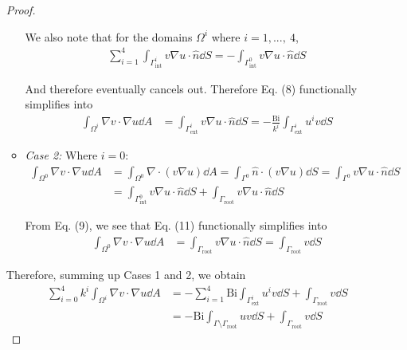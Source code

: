 \begin{enumerate}[label=(\alph*),leftmargin=*,itemsep=0mm]
\begin{proof}
\begin{itemize}
        We also note that for the domains $\Omega^i$ where $i=1, ...,\> 4$,
        \begin{align}
            \sum_{i=1}^{4} \int_{\Gamma^i_\text{int}} v\nabla u \cdot \hat{n} \dd{S} =
            - \int_{\Gamma^0_\text{int}} v\nabla u \cdot \hat{n} \dd{S}
        \end{align}
        
        And therefore eventually cancels out.  Therefore Eq. (8) functionally simplifies into
        \begin{align}
            \int_{\Omega^i} \nabla v \cdot \nabla u \dd{A}
            &= \int_{\Gamma^i_\text{ext}} v\nabla u \cdot \hat{n} \dd{S}
            = -\frac{\text{Bi}}{k^i} \int_{\Gamma^i_\text{ext}} u^i v \dd{S}
        \end{align}
        
        \item \textit{Case 2:} Where $i=0$:
        \begin{align}
            \int_{\Omega^0} \nabla v \cdot \nabla u \dd{A}
            &= \int_{\Omega^0} \nabla \cdot (v\nabla u) \dd{A} \nonumber
            = \int_{\Gamma^0} \hat{n} \cdot (v\nabla u) \dd{S}
            =  \int_{\Gamma^0} v\nabla u \cdot \hat{n} \dd{S} \nonumber \\
            &= \int_{\Gamma^0_\text{int}} v\nabla u \cdot \hat{n} \dd{S}
            + \int_{\Gamma_\text{root}} v\nabla u \cdot \hat{n} \dd{S}
        \end{align}
        
        From Eq. (9), we see that Eq. (11) functionally simplifies into
        \begin{align}
            \int_{\Omega^0} \nabla v \cdot \nabla u \dd{A}
            &= \int_{\Gamma_\text{root}} v\nabla u \cdot \hat{n} \dd{S}
            = \int_{\Gamma_\text{root}} v \dd{S}
        \end{align}
        
    \end{itemize}
    
    Therefore, summing up Cases 1 and 2, we obtain
    \begin{align*}
        \sum_{i=0}^4 k^i \int_{\Omega^i} \nabla v \cdot \nabla u \dd{A}
        &= - \sum_{i=1}^4 \text{Bi} \int_{\Gamma^i_\text{ext}} u^i v \dd{S}
        + \int_{\Gamma_\text{root}} v \dd{S} \\
        &= - \text{Bi} \int_{\Gamma\setminus\Gamma_\text{root}} u v \dd{S}
        + \int_{\Gamma_\text{root}} v \dd{S}
    \end{align*}
    

\end{proof}
\end{enumerate}
